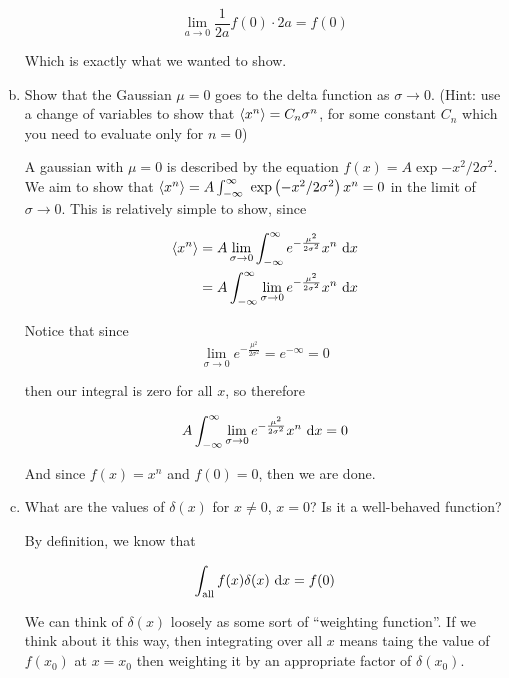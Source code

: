 \documentclass[10pt]{article}
\begin{document}
\begin{enumerate}[(a)]
\begin{solution}
            \[ \lim_{a \to 0} \frac{1}{2a} f(0) \cdot 2a = f(0)\] 

            Which is exactly what we wanted to show.
        \end{solution}

        \item Show that the Gaussian $\mu = 0$ goes to the delta function as $\sigma \to 0$. (Hint: use a change of variables to show that $\left \langle x^n \right \rangle = C_n\sigma^n$, for some constant $C_n$ which you need to evaluate only for $n = 0$)
        
        \begin{solution}
            A gaussian with $\mu = 0$ is described by the equation $f(x) = A\exp{-x^2/2\sigma^2}$. We aim to show that $ \left \langle x^n \right \rangle = A \int_{-\infty}^{\infty} \ \mathrm{exp}\left( -x^2/2\sigma^2 \right) x^n = 0$ in the limit of $\sigma \to 0$. This is relatively simple to show, since

            \begin{align*}
                \left \langle x^n \right \rangle &= A \lim_{\sigma \to 0} \int_{-\infty}^{\infty} e^{-\frac{\mu^2}{2\sigma^2}} x^n \ \dd x\\
                &= A \int_{-\infty}^{\infty} \lim_{\sigma \to 0} e^{-\frac{\mu^2}{2\sigma^2}} x^n \ \dd x 
            \end{align*}

            Notice that since
             \[ \lim_{\sigma \to 0} e^{-\frac{\mu^2}{2\sigma^2}} = e^{-\infty} = 0\]
             
            then our integral is zero for all $x$, so therefore 

            \[ A \int_{-\infty}^{\infty} \lim_{\sigma \to 0} e^{-\frac{\mu^2}{2\sigma^2}} x^n \ \dd x = 0\] 

            And since $f(x) = x^n$ and $f(0) = 0$, then we are done.
        \end{solution}
        \item What are the values of $\delta(x)$ for $x \neq 0$, $x = 0$? Is it a well-behaved function?
        

        \begin{solution}
            By definition, we know that 

            \[ \int_{\text{all}} f(x) \delta(x) \ \dd x = f(0)\]

            We can think of $\delta(x)$ loosely as some sort of ``weighting function''. If we think about it this way, then integrating over all $x$ means taing the value of $f(x_0)$ at $x = x_0$ then weighting it by an appropriate factor of $\delta(x_0)$. 


\end{solution}
\end{enumerate}
\end{document}

